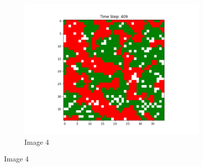\documentclass[12pt]{article}
\begin{document}
	\begin{figure}[h]
		\centering
		
		\begin{subfigure}{0.2\textwidth}
			\includegraphics[width=\linewidth]{final_random.png}
			\caption{Image 4}
		\end{subfigure}
		

\end{figure}
\end{document}
